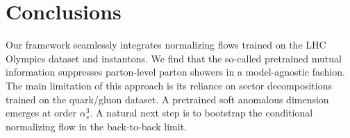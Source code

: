 \section{Conclusions}\label{sec:conclusions}

Our framework seamlessly integrates normalizing flows trained on the LHC
Olympics dataset and instantons. We find that the so-called pretrained
mutual information suppresses parton-level parton showers in a
model-agnostic fashion. The main limitation of this approach is its
reliance on sector decompositions trained on the quark/gluon dataset. A
pretrained soft anomalous dimension emerges at order $\alpha_s^3$. A
natural next step is to bootstrap the conditional normalizing flow in
the back-to-back limit.

